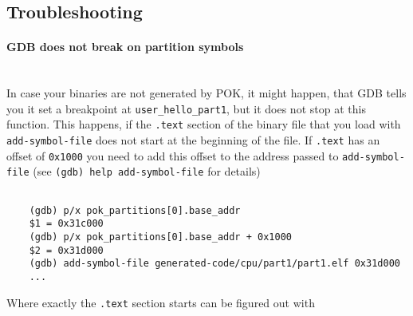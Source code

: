 \documentclass[oneside]{article}
\begin{document}
\subsection{Troubleshooting}
  \paragraph{GDB does not break on partition symbols} 
  \ \\
  In case your binaries are not generated by POK, it might happen, that GDB
  tells you it set a breakpoint at \texttt{user\_hello\_part1}, but it does not
  stop at this function.
  This happens, if the \texttt{.text} section of the binary file that you load 
  with \texttt{add-symbol-file} does not start at the beginning of the file.
  If \texttt{.text} has an offset of \texttt{0x1000} you need to add this
  offset to the address passed to \texttt{add-symbol-file} (see 
  \texttt{(gdb) help add-symbol-file} for details)

  {
    \normalsize
    \begin{verbatim}
    
    (gdb) p/x pok_partitions[0].base_addr
    $1 = 0x31c000
    (gdb) p/x pok_partitions[0].base_addr + 0x1000
    $2 = 0x31d000
    (gdb) add-symbol-file generated-code/cpu/part1/part1.elf 0x31d000
    ...
    \end{verbatim}
  }

\noindent Where exactly the \texttt{.text} section starts can be figured out with
  
\end{document}
